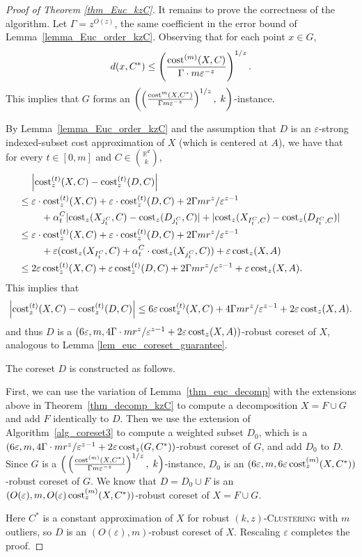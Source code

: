 \documentclass[11pt,letterpaper]{article}
\theoremstyle{definition}
\newcommand{\eps}{\varepsilon}
\newcommand{\ProblemName}[1]{\textsc{#1}}
\newcommand{\kzC}{\ProblemName{$(k, z)$-Clustering}\xspace}
\newcommand{\LH}[1]{\textcolor{blue}{LH: #1}}
\DeclarePairedDelimiter{\abs}{\lvert}{\rvert}
\begin{document}
\begin{proof}[Proof of Theorem \ref{thm_Euc_kzC}]


%
It remains to prove the correctness of the algorithm. Let $\Gamma = z^{O(z)}$, the same coefficient in the error bound of Lemma~\ref{lemma_Euc_order_kzC}.
%
Observing that for each point \( x \in G \),  
\[
d(x, C^\ast) \leq \left( \frac{\cost[m](X, C)}{\Gamma \cdot m \eps^{-z}} \right)^{1/z}.
\]  
%
This implies that \( G \) forms an \( \left( \left( \frac{\cost^{m}(X, C^\ast)}{\Gamma m \eps^{-z}} \right)^{1/z},\; k \right) \)-instance.  

By Lemma~\ref{lemma_Euc_order_kzC} and the assumption that $D$ is an $\eps$-strong indexed-subset cost approximation of $X$ (which is centered at $A$), we have that for every $t\in [0,m]$ and $C\in \binom{\mathbb{R}^d}{k}$, 
\begin{align*}
            &\abs*{\cost[t]_z(X,C)-\cost[t]_z(D,C)} \\
    \leq{}  & \eps\cdot \cost[t]_z(X,C)+\eps\cdot \cost[t]_z(D,C)+2\Gamma mr^z/\eps^{z-1}\\
            &\quad + \alpha_t^C\abs{\cost_z(X_{j_t^C},C)-\cost_z(D_{j_t^C},C)} + \abs{\cost_z(X_{I_t^C,C})-\cost_z(D_{I_t^C,C})} \\
    \leq{}  & \eps\cdot \cost[t]_z(X,C)+\eps\cdot\cost[t]_z(D,C) + 2\Gamma mr^z/\eps^{z-1}\\
            & \quad + \eps(\cost_z(X_{I_t^C},C) + \alpha_{t}^C\cdot \cost_z(X_{j_t^C},C)) + \eps\cost_z(X,A) \\
    \leq{}  & 2\eps\cost[t]_z(X,C) + \eps\cost[t]_z(D,C) + 2\Gamma mr^z/\eps^{z-1} + \eps\cost_z(X,A).
\end{align*}
This implies that
\[
    \abs*{\cost[t]_z(X,C)-\cost[t]_z(D,C)} \leq 6\eps\cost[t]_z(X,C) + 4\Gamma mr^z/\eps^{z-1} + 2\eps\cost_z(X,A).
\]
and thus $D$ is a $(6\eps, m , 4\Gamma\cdot mr^z/\eps^{z-1} + 2\eps\cost_z(X,A))$-robust coreset of $X$, analogous to Lemma \ref{lem_euc_coreset_guarantee}. 

%
The coreset $D$ is constructed as follows. 

%
First, we can use the variation of Lemma~\ref{thm_euc_decomp} with the extensions above in Theorem~\ref{thm_decomp_kzC} to compute a decomposition $X=F\cup G$ and add $F$ identically to $D$. Then we use the extension of Algorithm~\ref{alg_coreset3} to compute a weighted subset $D_0$, which is a $(6\eps, m , 4\Gamma\cdot mr^z/\eps^{z-1} + 2\eps\cost_z(G,C^\ast))$-robust coreset of $G$, and add $D_0$ to $D$. 
Since \( G \) is a \( \Big( \left( \frac{\cost[m](X, C^\ast)}{\Gamma m \eps^{-z}} \right)^{1/z},\; k \Big) \)-instance, $D_0$ is an $(6\eps,m,6\eps\cost[m]_z(X,C^\ast))$-robust coreset of $G$. 
We know that $D=D_0\cup F$ is an $(O(\eps), m, O(\eps) \cost[m]_z(X,C^\ast))$-robust coreset of $X=F\cup G$. 

%
Here $C^\ast$ is a constant approximation of $X$ for robust \kzC with $m$ outliers, so $D$ is an $(O(\eps),m)$-robust coreset of $X$. Rescaling $\eps$ completes the proof.
\end{proof}
\end{document}
